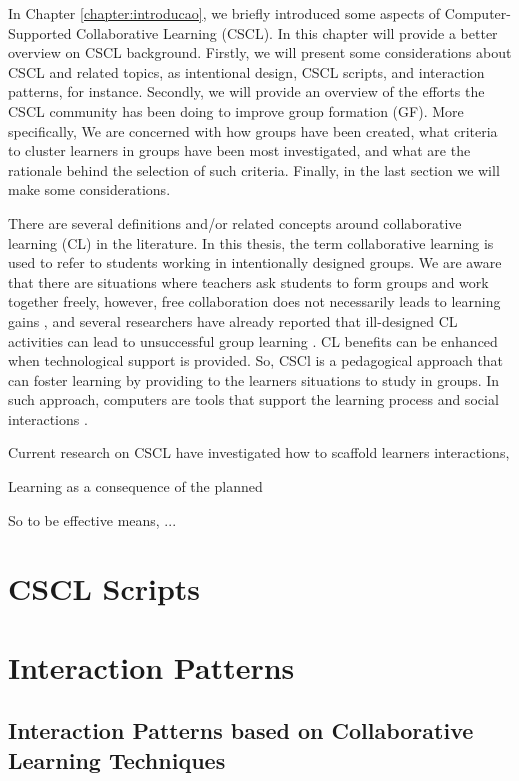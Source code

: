 \label{cha:background-cscl}
In Chapter \ref{chapter:introducao}, we briefly introduced some aspects of Computer-Supported Collaborative Learning (CSCL). In this chapter will provide a better overview on CSCL background. Firstly, we will present some considerations about CSCL and related topics, as intentional design, CSCL scripts, and interaction patterns, for instance. Secondly, we will provide an overview of the efforts the CSCL community has been doing to improve group formation (GF). More specifically, We are concerned with how groups have been created, what criteria to cluster learners in groups have been most investigated, and what are the rationale behind the selection of such criteria. Finally, in the last section we will make some considerations.

There are several definitions and/or related concepts around collaborative learning (CL) in the literature. In this thesis, the term collaborative learning is used to refer to students working in intentionally designed groups. We are aware that there are situations where teachers ask students to form groups and work together freely, however, free collaboration does not necessarily leads to learning gains \cite{An_Ontological_Engineering_Approach_tese}, and several researchers have already reported that ill-designed CL activities can lead to unsuccessful group learning \cite{Motivation_in_a_computer-supported_collaborative_learning}. CL benefits can be enhanced when technological support is provided. So, CSCl is a pedagogical approach that can foster learning by providing to the learners situations to study in groups. In such approach, computers are tools that support the learning process and social interactions \cite{CSCL_historical_perspective}. 

Current research on CSCL have investigated how to scaffold learners interactions, 


Learning as a consequence of the planned 

So to be effective means, ...

\section{CSCL Scripts}

\section{Interaction Patterns}

\subsection{Interaction Patterns based on Collaborative Learning Techniques}

